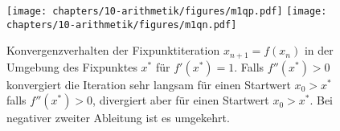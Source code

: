 %
%
%
\begin{figure}
\centering
\texttt{[image: chapters/10-arithmetik/figures/m1qp.pdf]}
\texttt{[image: chapters/10-arithmetik/figures/m1qn.pdf]}
\caption{Konvergenzverhalten der Fixpunktiteration $x_{n+1}=f(x_n)$
in der Umgebung des Fixpunktes $x^*$ für $f'(x^*)=1$.
Falls $f''(x^*)>0$ konvergiert die Iteration sehr langsam
für einen Startwert $x_0>x^*$ falls $f''(x^*)>0$, divergiert
aber für einen Startwert $x_0>x^*$. 
Bei negativer zweiter Ableitung ist es umgekehrt.
\label{buch:figure:fixpunkt:abl1}}
\end{figure}
